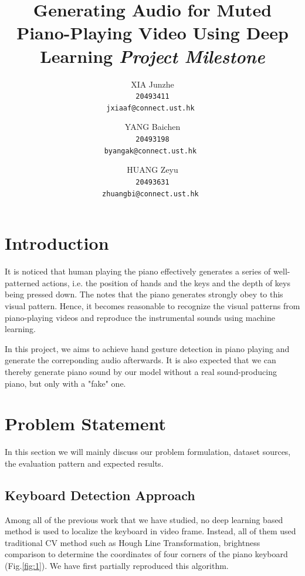 \documentclass[10pt,twocolumn,letterpaper]{article}
\begin{document}
\title{Generating Audio for Muted Piano-Playing Video Using Deep Learning \newline \newline \textit{Project Milestone}}


\author{XIA Junzhe\\
\tt\small 20493411\\
{\tt\small jxiaaf@connect.ust.hk}
\and
YANG Baichen\\
\tt\small 20493198\\
{\tt\small byangak@connect.ust.hk}
\and
HUANG Zeyu\\
\tt\small 20493631\\
{\tt\small zhuangbi@connect.ust.hk}
}


\maketitle

\section{Introduction}

It is noticed that human playing the piano effectively generates a series of well-patterned actions,
i.e. the position of hands and the keys and the depth of keys being pressed down.
The notes that the piano generates strongly obey to this visual pattern.
Hence, it becomes reasonable to recognize the visual patterns from piano-playing videos and reproduce the instrumental sounds using machine learning.

In this project, we aims to achieve hand gesture detection in piano playing and generate the correponding audio afterwards.
It is also expected that we can thereby generate piano sound by our model without a real sound-producing piano, but only with a "fake" one.

\section{Problem Statement}
In this section we will mainly discuss our problem formulation, dataset sources, the evaluation pattern and expected results.

\subsection{Keyboard Detection Approach}  
Among all of the previous work that we have studied, no deep learning based method is used to localize the keyboard in video frame. Instead, all of them used traditional CV method such as Hough Line Transformation, brightness comparison to determine the coordinates of four corners of the piano keyboard (Fig.\ref{fig:1}). We have first partially reproduced this algorithm.
\end{document}
